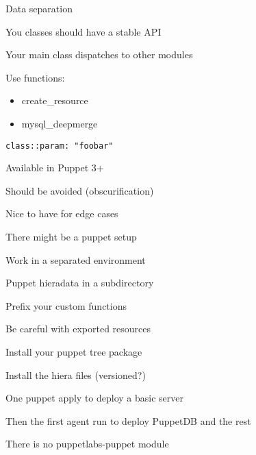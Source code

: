 
\begin{iframe}[Hiera]
\item Data separation
\item You classes should have a stable API
\item Your main class dispatches to other modules
\item Use functions:
\begin{itemize}
    \item create\_resource
    \item mysql\_deepmerge
\end{itemize}
\end{iframe}
\begin{iframe}
\item{\texttt{class::param: "foobar"}}
\item Available in Puppet 3+
\item Should be avoided (obscurification)
\item Nice to have for edge cases
\end{iframe}


\begin{iframe}
\item There might be a puppet setup
\item Work in a separated environment
\item Puppet hieradata in a subdirectory
\item Prefix your custom functions
\item Be careful with exported resources
\end{iframe}

\begin{iframe}
\item Install your puppet tree package
\item Install the hiera files (versioned?)
\item One puppet apply to deploy a basic server
\item Then the first agent run to deploy PuppetDB and the rest
\item There is no puppetlabs-puppet module
\end{iframe}


